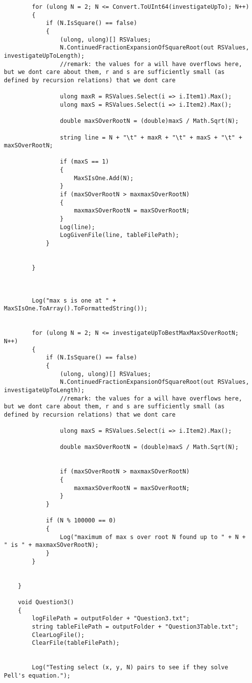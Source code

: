 \documentclass{article}
\begin{document}
\begin{lstlisting}
		for (ulong N = 2; N <= Convert.ToUInt64(investigateUpTo); N++)
		{
			if (N.IsSquare() == false)
			{
				(ulong, ulong)[] RSValues;
				N.ContinuedFractionExpansionOfSquareRoot(out RSValues, investigateUpToLength);
				//remark: the values for a will have overflows here, but we dont care about them, r and s are sufficiently small (as defined by recursion relations) that we dont care
				
				ulong maxR = RSValues.Select(i => i.Item1).Max();
				ulong maxS = RSValues.Select(i => i.Item2).Max();
				
				double maxSOverRootN = (double)maxS / Math.Sqrt(N);
				
				string line = N + "\t" + maxR + "\t" + maxS + "\t" + maxSOverRootN;
				
				if (maxS == 1)
				{
					MaxSIsOne.Add(N);
				}
				if (maxSOverRootN > maxmaxSOverRootN)
				{
					maxmaxSOverRootN = maxSOverRootN;
				}
				Log(line);
				LogGivenFile(line, tableFilePath);
			}
			
			
		}
		
		
		
		Log("max s is one at " + MaxSIsOne.ToArray().ToFormattedString());
		
		
		for (ulong N = 2; N <= investigateUpToBestMaxMaxSOverRootN; N++)
		{
			if (N.IsSquare() == false)
			{
				(ulong, ulong)[] RSValues;
				N.ContinuedFractionExpansionOfSquareRoot(out RSValues, investigateUpToLength);
				//remark: the values for a will have overflows here, but we dont care about them, r and s are sufficiently small (as defined by recursion relations) that we dont care
				
				ulong maxS = RSValues.Select(i => i.Item2).Max();
				
				double maxSOverRootN = (double)maxS / Math.Sqrt(N);
				
				
				if (maxSOverRootN > maxmaxSOverRootN)
				{
					maxmaxSOverRootN = maxSOverRootN;
				}
			}
			
			if (N % 100000 == 0)
			{
				Log("maximum of max s over root N found up to " + N + " is " + maxmaxSOverRootN);
			}
		}
		
		
	}
	
	void Question3()
	{
		logFilePath = outputFolder + "Question3.txt";
		string tableFilePath = outputFolder + "Question3Table.txt";
		ClearLogFile();
		ClearFile(tableFilePath);
		
		
		Log("Testing select (x, y, N) pairs to see if they solve Pell's equation.");
		

\end{lstlisting}
\end{document}
